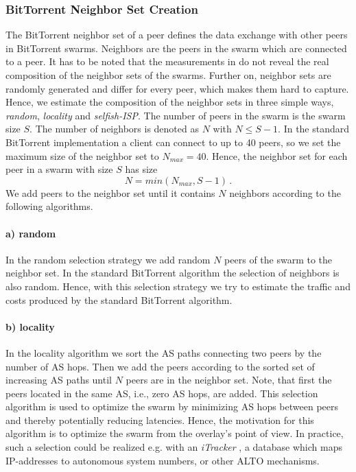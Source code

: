 \subsubsection{BitTorrent Neighbor Set Creation}

The BitTorrent neighbor set of a peer defines the data exchange with other peers in BitTorrent swarms. Neighbors are the peers in the swarm which are connected to a peer. It has to be noted that the measurements in \cite{Hossfeld2011} do not reveal the real composition of the neighbor sets of the swarms. Further on, neighbor sets are randomly generated and differ for every peer, which makes them hard to capture. Hence, we estimate the composition of the neighbor sets in three simple ways, \textit{random}, \textit{locality} and \textit{selfish-ISP}.
The number of peers in the swarm is the swarm size $S$. The number of neighbors is denoted as $N$ with $N\leq S-1$. In the standard BitTorrent implementation a client can connect to up to 40 peers, so we set the maximum size of the neighbor set to $N_{max}=40$. Hence, the neighbor set for each peer in a swarm with size $S$ has size
\begin{equation}
N=min(N_{max},S-1) \, .
\end{equation}
We add peers to the neighbor set until it contains $N$ neighbors according to the following algorithms.
\paragraph{a) random}
In the random selection strategy we add random $N$ peers of the swarm to the neighbor set. In the standard BitTorrent algorithm the selection of neighbors is also random. Hence, with this selection strategy we try to estimate the traffic and costs produced by the standard BitTorrent algorithm.
\paragraph{b) locality}
In the locality algorithm we sort the AS paths connecting two peers by the number of AS hops. Then we add the peers according to the sorted set of increasing AS paths until $N$ peers are in the neighbor set. Note, that first the peers located in the same AS, i.e., zero AS hops, are added. This selection algorithm is used to optimize the swarm by minimizing AS hops between peers and thereby potentially reducing latencies. Hence, the motivation for this algorithm is to optimize the swarm from the overlay's point of view.
In practice, such a selection could be realized e.g. with an \emph{iTracker} \cite{Xie2008}, a database which maps IP-addresses to autonomous system numbers, or other ALTO mechanisms.
